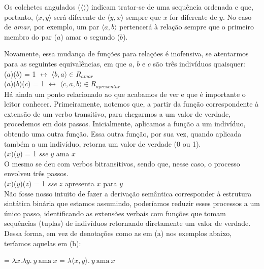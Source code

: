 \n Os colchetes angulados ($\langle \rangle$) indicam tratar-se de uma sequência ordenada e que, portanto, $\langle x,y \rangle$ será diferente de $\langle y,x \rangle$ sempre que $x$ for diferente de $y$. No caso de \textit{amar}, por exemplo, um par $\langle a,b \rangle$ pertencerá à relação sempre que o primeiro membro do par ($a$) amar o segundo ($b$).

Novamente, essa mudança de funções para relações é inofensiva, se atentarmos para as seguintes equivalências, em que $a$, $b$ e $c$ são três indivíduos quaisquer: \\

\n {}($a$)($b$) = 1 $\leftrightarrow$ $\langle b,a \rangle \in R_{amar}$ \\

\n {}($a$)($b$)($c$) = 1 $\leftrightarrow$ $\langle c,a,b \rangle \in R_{apresentar}$ \\

Há ainda um ponto relacionado ao que acabamos de ver e que é importante o leitor conhecer. Primeiramente, notemos que, a partir da função correspondente à extensão de um verbo transitivo, para chegarmos a um valor de verdade, procedemos em dois passos. Inicialmente, aplicamos a função a um indivíduo, obtendo uma outra função. Essa outra função, por sua vez, quando aplicada também a um indivíduo, retorna um valor de verdade (0 ou 1). \\

\n {}($x$)($y$) = 1 \textit{sse} $y$ ama $x$ \\

\n O mesmo se deu com verbos bitransitivos, sendo que, nesse caso, o processo envolveu três passos. \\

\n {}($x$)($y$)($z$) = 1 \textit{sse} $z$ apresenta $x$ para $y$ \\

\n Não fosse nosso intuito de fazer a derivação semântica corresponder à estrutura sintática binária que estamos assumindo, poderíamos reduzir esses processos a um único passo, identificando as extensões verbais com funções que tomam sequências (tuplas) de indivíduos retornando diretamente um valor de verdade. Dessa forma, em vez de denotações como as em (a) nos exemplos abaixo, teríamos aquelas em (b):

\begin{exe}
	\ex
	\begin{xlist}
\ex {} = $\lambda x.\lambda y.\ y\ \text{ama}\ x$
\ex {} = $\lambda\langle x,y \rangle.\  y\ \text{ama}\ x$
	\end{xlist}
\end{exe}

